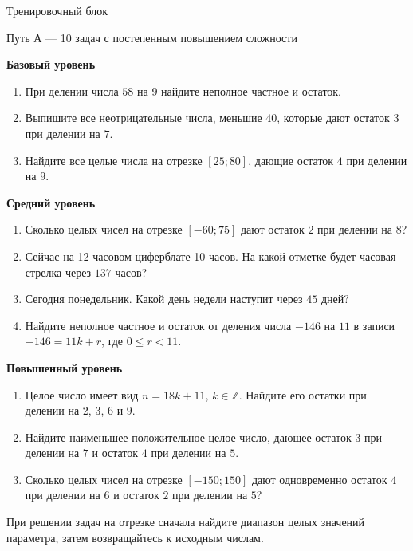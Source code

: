 \documentclass[a4paper,12pt]{article}
\begin{document}
\begin{center}
{\Large\color{darkaccent} Тренировочный блок}\par
\vspace{1mm}
{\small\color{muted}Путь А --- 10 задач с постепенным повышением сложности}
\end{center}
\vspace{4mm}
\textcolor{darkaccent}{\textbf{Базовый уровень}}
\begin{enumerate}
\item При делении числа $58$ на $9$ найдите неполное частное и остаток.
\item Выпишите все неотрицательные числа, меньшие $40$, которые дают остаток $3$ при делении на $7$.
\item Найдите все целые числа на отрезке $[25;80]$, дающие остаток $4$ при делении на $9$.
\end{enumerate}
\medskip
\textcolor{darkaccent}{\textbf{Средний уровень}}
\begin{enumerate}[resume]
\item Сколько целых чисел на отрезке $[-60;75]$ дают остаток $2$ при делении на $8$?
\item Сейчас на 12-часовом циферблате 10 часов. На какой отметке будет часовая стрелка через $137$ часов?
\item Сегодня понедельник. Какой день недели наступит через $45$ дней?
\item Найдите неполное частное и остаток от деления числа $-146$ на $11$ в записи $-146=11k+r$, где $0\le r<11$.
\end{enumerate}
\medskip
\textcolor{darkaccent}{\textbf{Повышенный уровень}}
\begin{enumerate}[resume]
\item Целое число имеет вид $n=18k+11$, $k\in\mathbb Z$. Найдите его остатки при делении на $2$, $3$, $6$ и $9$.
\item Найдите наименьшее положительное целое число, дающее остаток $3$ при делении на $7$ и остаток $4$ при делении на $5$.
\item Сколько целых чисел на отрезке $[-150;150]$ дают одновременно остаток $4$ при делении на $6$ и остаток $2$ при делении на $5$?
\end{enumerate}
\vfill
\textcolor{muted}{\small При решении задач на отрезке сначала найдите диапазон целых значений параметра, затем возвращайтесь к исходным числам.}
\clearpage
\end{document}
